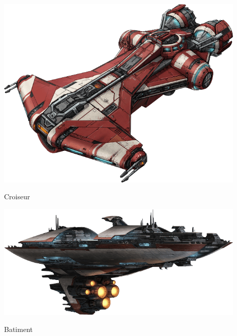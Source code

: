 \onecolumn
\begin{center}
    \vspace*{\fill}
    \includegraphics[width=0.9\textwidth]{img/equipement/croiseur.png}
    \caption{Croiseur}
    \vspace*{\fill}
    \includegraphics[width=0.9\textwidth]{img/equipement/batiment.png}
    \caption{Batiment}
    \vspace*{\fill}
\end{center}
\twocolumn